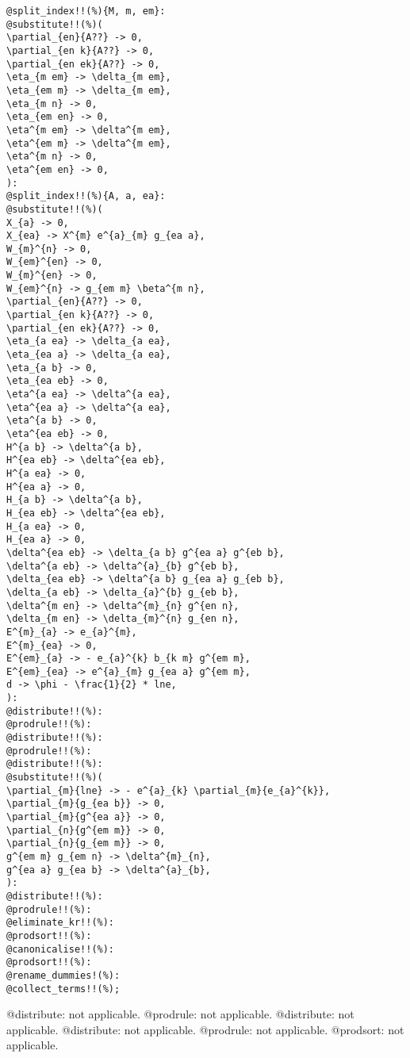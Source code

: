\documentclass[11pt]{article}
\begin{document}
{\color[named]{Blue}\begin{verbatim}
@split_index!!(%){M, m, em}:
@substitute!!(%)(
\partial_{en}{A??} -> 0,
\partial_{en k}{A??} -> 0,
\partial_{en ek}{A??} -> 0,
\eta_{m em} -> \delta_{m em},
\eta_{em m} -> \delta_{m em},
\eta_{m n} -> 0,
\eta_{em en} -> 0,
\eta^{m em} -> \delta^{m em},
\eta^{em m} -> \delta^{m em},
\eta^{m n} -> 0,
\eta^{em en} -> 0,
):
@split_index!!(%){A, a, ea}:
@substitute!!(%)(
X_{a} -> 0,
X_{ea} -> X^{m} e^{a}_{m} g_{ea a},
W_{m}^{n} -> 0,
W_{em}^{en} -> 0,
W_{m}^{en} -> 0,
W_{em}^{n} -> g_{em m} \beta^{m n},
\partial_{en}{A??} -> 0,
\partial_{en k}{A??} -> 0,
\partial_{en ek}{A??} -> 0,
\eta_{a ea} -> \delta_{a ea},
\eta_{ea a} -> \delta_{a ea},
\eta_{a b} -> 0,
\eta_{ea eb} -> 0,
\eta^{a ea} -> \delta^{a ea},
\eta^{ea a} -> \delta^{a ea},
\eta^{a b} -> 0,
\eta^{ea eb} -> 0,
H^{a b} -> \delta^{a b},
H^{ea eb} -> \delta^{ea eb},
H^{a ea} -> 0,
H^{ea a} -> 0,
H_{a b} -> \delta^{a b},
H_{ea eb} -> \delta^{ea eb},
H_{a ea} -> 0,
H_{ea a} -> 0,
\delta^{ea eb} -> \delta_{a b} g^{ea a} g^{eb b},
\delta^{a eb} -> \delta^{a}_{b} g^{eb b},
\delta_{ea eb} -> \delta^{a b} g_{ea a} g_{eb b},
\delta_{a eb} -> \delta_{a}^{b} g_{eb b},
\delta^{m en} -> \delta^{m}_{n} g^{en n},
\delta_{m en} -> \delta_{m}^{n} g_{en n},
E^{m}_{a} -> e_{a}^{m},
E^{m}_{ea} -> 0,
E^{em}_{a} -> - e_{a}^{k} b_{k m} g^{em m},
E^{em}_{ea} -> e^{a}_{m} g_{ea a} g^{em m},
d -> \phi - \frac{1}{2} * lne,
):
@distribute!!(%):
@prodrule!!(%):
@distribute!!(%):
@prodrule!!(%):
@distribute!!(%):
@substitute!!(%)(
\partial_{m}{lne} -> - e^{a}_{k} \partial_{m}{e_{a}^{k}},
\partial_{m}{g_{ea b}} -> 0,
\partial_{m}{g^{ea a}} -> 0,
\partial_{n}{g^{em m}} -> 0,
\partial_{n}{g_{em m}} -> 0,
g^{em m} g_{em n} -> \delta^{m}_{n},
g^{ea a} g_{ea b} -> \delta^{a}_{b},
):
@distribute!!(%):
@prodrule!!(%):
@eliminate_kr!!(%):
@prodsort!!(%):
@canonicalise!!(%):
@prodsort!!(%):
@rename_dummies!(%):
@collect_terms!!(%);
\end{verbatim}}
@distribute: not applicable.
@prodrule: not applicable.
@distribute: not applicable.
@distribute: not applicable.
@prodrule: not applicable.
@prodsort: not applicable.
\end{document}
